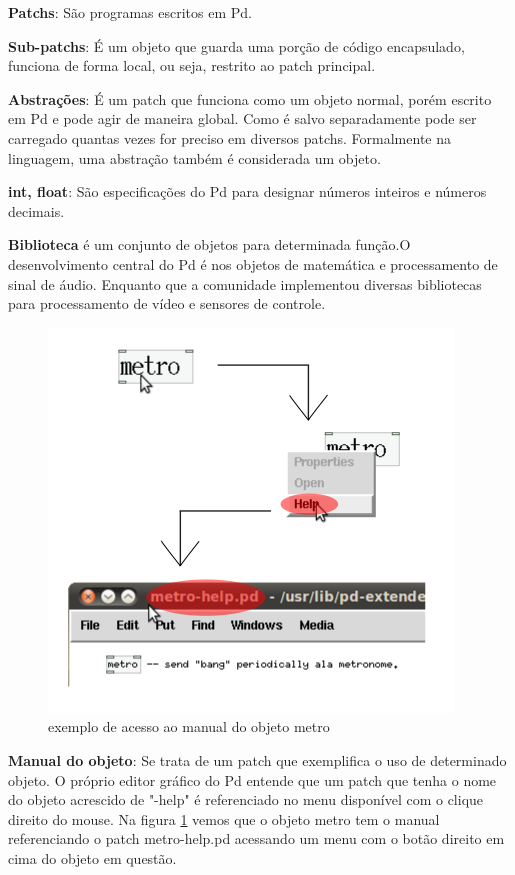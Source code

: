 \documentclass{ppgmus}
\begin{document}
\textbf{Patchs}: São programas escritos em Pd.

\textbf{Sub-patchs}: É um objeto que guarda uma porção de código encapsulado, funciona
de forma local, ou seja, restrito ao patch principal.

\textbf{Abstrações}: É um patch que funciona como um objeto normal, porém escrito em Pd e pode agir de maneira global.
Como é salvo separadamente pode ser carregado quantas vezes for preciso em diversos patchs. Formalmente na linguagem,
 uma abstração também é considerada um objeto.

\textbf{int, float}: São especificações do Pd para designar números inteiros e números decimais.

\textbf{Biblioteca} é um conjunto de objetos para determinada função.O desenvolvimento
central do Pd é nos objetos de matemática e processamento de sinal de áudio. Enquanto
que a comunidade implementou diversas bibliotecas para processamento de vídeo e sensores
de controle. 


\begin{figure}
\includegraphics[scale=.6]{help}
\caption{exemplo de acesso ao manual do objeto metro}
\label{help}
\end{figure}


\textbf{Manual do objeto}: Se trata de um patch que exemplifica o uso de determinado
objeto. O próprio editor gráfico do Pd entende que um patch que tenha o nome do objeto 
acrescido de "-help" é referenciado no menu disponível com o clique direito do mouse. 
Na figura \ref{help} vemos que o objeto metro tem o manual
referenciando o patch metro-help.pd acessando um 
menu com o botão direito em cima do objeto em questão.
\end{document}
